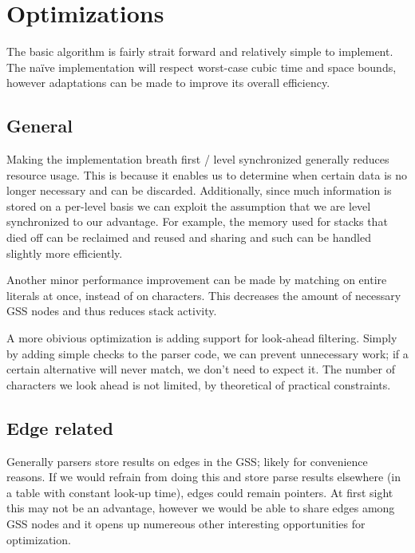 \documentclass[a4paper,10pt]{article}
\begin{document}
\section{Optimizations}

The basic algorithm is fairly strait forward and relatively simple to implement. The naïve implementation will respect worst-case cubic time and space bounds, however adaptations can be made to improve its overall efficiency.

\subsection{General}

Making the implementation breath first / level synchronized generally reduces resource usage. This is because it enables us to determine when certain data is no longer necessary and can be discarded. Additionally, since much information is stored on a per-level basis we can exploit the assumption that we are level synchronized to our advantage. For example, the memory used for stacks that died off can be reclaimed and reused and sharing and such can be handled slightly more efficiently.

Another minor performance improvement can be made by matching on entire literals at once, instead of on characters. This decreases the amount of necessary GSS nodes and thus reduces stack activity.

A more obivious optimization is adding support for look-ahead filtering. Simply by adding simple checks to the parser code, we can prevent unnecessary work; if a certain alternative will never match, we don't need to expect it. The number of characters we look ahead is not limited, by theoretical of practical constraints.

\subsection{Edge related}

Generally parsers store results on edges in the GSS; likely for convenience reasons. If we would refrain from doing this and store parse results elsewhere (in a table with constant look-up time), edges could remain pointers. At first sight this may not be an advantage, however we would be able to share edges among GSS nodes and it opens up numereous other interesting opportunities for optimization.
\end{document}
